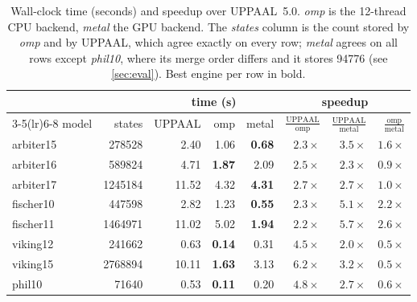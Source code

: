\begin{table}[t]
\centering
\caption{Wall-clock time (seconds) and speedup over UPPAAL~5.0.  \emph{omp} is
the 12-thread CPU backend, \emph{metal} the GPU backend.  The \emph{states}
column is the count stored by \emph{omp} and by UPPAAL, which agree exactly on
every row; \emph{metal} agrees on all rows except \emph{phil10}, where its merge
order differs and it stores \num{94776} (see \cref{sec:eval}).  Best engine per
row in bold.}
\label{tab:main}
\setlength{\tabcolsep}{5pt}
\begin{tabular}{lrrrrrrr}
\toprule
& & \multicolumn{3}{c}{time (\si{\second})} & \multicolumn{3}{c}{speedup} \\
\cmidrule(lr){3-5}\cmidrule(lr){6-8}
model & states & UPPAAL & omp & metal
      & $\frac{\text{UPPAAL}}{\text{omp}}$
      & $\frac{\text{UPPAAL}}{\text{metal}}$
      & $\frac{\text{omp}}{\text{metal}}$ \\
\midrule
arbiter15 & \num{278528}  & 2.40  & 1.06          & \textbf{0.68} & $2.3\times$ & $3.5\times$ & $1.6\times$ \\
arbiter16 & \num{589824}  & 4.71  & \textbf{1.87} & 2.09          & $2.5\times$ & $2.3\times$ & $0.9\times$ \\
arbiter17 & \num{1245184} & 11.52 & 4.32          & \textbf{4.31} & $2.7\times$ & $2.7\times$ & $1.0\times$ \\
\midrule
fischer10 & \num{447598}  & 2.82  & 1.23          & \textbf{0.55} & $2.3\times$ & $5.1\times$ & $2.2\times$ \\
fischer11 & \num{1464971} & 11.02 & 5.02          & \textbf{1.94} & $2.2\times$ & $5.7\times$ & $2.6\times$ \\
\midrule
viking12  & \num{241662}  & 0.63  & \textbf{0.14} & 0.31          & $4.5\times$ & $2.0\times$ & $0.5\times$ \\
viking15  & \num{2768894} & 10.11 & \textbf{1.63} & 3.13          & $6.2\times$ & $3.2\times$ & $0.5\times$ \\
\midrule
phil10    & \num{71640}   & 0.53  & \textbf{0.11} & 0.20          & $4.8\times$ & $2.7\times$ & $0.6\times$ \\
\bottomrule
\end{tabular}
\end{table}

